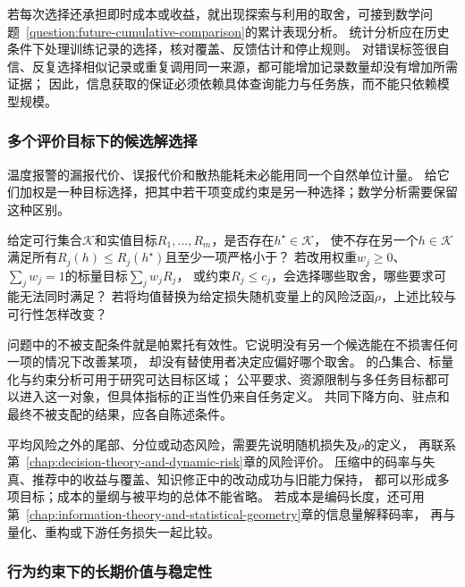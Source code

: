 若每次选择还承担即时成本或收益，就出现探索与利用的取舍，可接到数学问题~\ref{question:future-cumulative-comparison}的累计表现分析。
统计分析应在历史条件下处理训练记录的选择，核对覆盖、反馈估计和停止规则。
对错误标签很自信、反复选择相似记录或重复调用同一来源，都可能增加记录数量却没有增加所需证据；
因此，信息获取的保证必须依赖具体查询能力与任务族，而不能只依赖模型规模。

\subsubsection{多个评价目标下的候选解选择}
\label{sec:future-analysis-multiple-objectives}

温度报警的漏报代价、误报代价和散热能耗未必能用同一个自然单位计量。
给它们加权是一种目标选择，把其中若干项变成约束是另一种选择；数学分析需要保留这种区别。

\begin{mathproblem}
  \label{question:future-multiple-objectives}
  给定可行集合$\mathcal K$和实值目标$R_1,\ldots,R_m$，是否存在$h^\star\in\mathcal K$，
  使不存在另一个$h\in\mathcal K$满足所有$R_j(h)\leq R_j(h^\star)$且至少一项严格小于？
  若改用权重$w_j\geq0$、$\sum_jw_j=1$的标量目标$\sum_jw_jR_j$，
  或约束$R_j\leq c_j$，会选择哪些取舍，哪些要求可能无法同时满足？
  若将均值替换为给定损失随机变量上的风险泛函$\rho$，上述比较与可行性怎样改变？
\end{mathproblem}

问题中的不被支配条件就是帕累托有效性。它说明没有另一个候选能在不损害任何一项的情况下改善某项，
却没有替使用者决定应偏好哪个取舍。
的凸集合、标量化与约束分析可用于研究可达目标区域；
公平要求、资源限制与多任务目标都可以进入这一对象，但具体指标的正当性仍来自任务定义。
共同下降方向、驻点和最终不被支配的结果，应各自陈述条件。

平均风险之外的尾部、分位或动态风险，需要先说明随机损失及$\rho$的定义，
再联系第~\ref{chap:decision-theory-and-dynamic-risk}章的风险评价。
压缩中的码率与失真、推荐中的收益与覆盖、知识修正中的改动成功与旧能力保持，
都可以形成多项目标；成本的量纲与被平均的总体不能省略。
若成本是编码长度，还可用第~\ref{chap:information-theory-and-statistical-geometry}章的信息量解释码率，
再与量化、重构或下游任务损失一起比较。

\subsubsection{行为约束下的长期价值与稳定性}
\label{sec:future-analysis-closed-loop}

